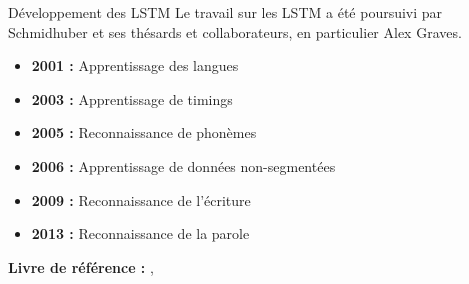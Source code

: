 \begin{frame}{Développement des LSTM}
    Le travail sur les LSTM a été poursuivi par Schmidhuber et ses thésards et collaborateurs, en particulier Alex Graves.
    \begin{itemize}
        \item \textbf{2001 :} Apprentissage des langues \cite{Gers01}
        \item \textbf{2003 :} Apprentissage de timings \cite{Gers03}
        \item \textbf{2005 :} Reconnaissance de phonèmes \cite{Graves05a,Graves05b}
        \item \textbf{2006 :} Apprentissage de données non-segmentées \cite{Graves06}
        \item \textbf{2009 :} Reconnaissance de l'écriture \cite{Graves09a,Graves09b}
        \item \textbf{2013 :} Reconnaissance de la parole \cite{Graves13a}
    \end{itemize}
    
    \textbf{Livre de référence :} \citeauthor{Graves12}, \textit{} \cite{Graves12}
\end{frame}

